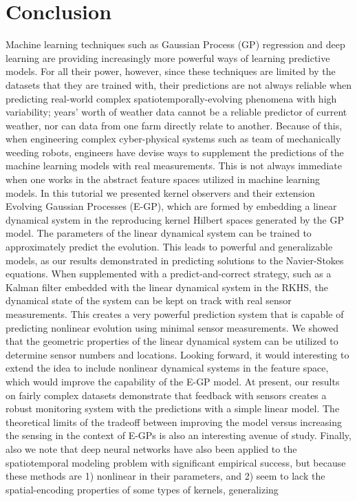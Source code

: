 \documentclass[letterpaper,12pt,peerreviewca,draftcls]{IEEEtran}
\begin{document}







%

\section{Conclusion}\label{sec:conclusion}
Machine learning techniques such as Gaussian Process (GP) regression and deep learning are providing increasingly more powerful ways of learning predictive models. For all their power, however, since these techniques are limited by the datasets that they are trained with, their predictions are not always reliable when predicting real-world complex spatiotemporally-evolving phenomena with high variability; years' worth of weather data cannot be a reliable predictor of current weather, nor can data from one farm directly relate to another. Because of this, when engineering complex cyber-physical systems such as team of mechanically weeding robots, engineers have devise ways to supplement the predictions of the machine learning models with real measurements. This is not always immediate when one works in the abstract feature spaces utilized in machine learning models. In this tutorial we presented kernel observers and their extension Evolving Gaussian Processes (E-GP), which are formed by embedding a linear dynamical system in the reproducing kernel Hilbert spaces generated by the GP model. The parameters of the linear dynamical system can be trained to approximately predict the evolution. This leads to powerful and generalizable models, as our results demonstrated in predicting solutions to the Navier-Stokes equations. When supplemented with a predict-and-correct strategy, such as a Kalman filter embedded with the linear dynamical system in the RKHS, the dynamical state of the system can be kept on track with real sensor measurements. This creates a very powerful prediction system that is capable of predicting nonlinear evolution using minimal sensor measurements. We showed that the geometric properties of the linear dynamical system can be utilized to determine sensor numbers and locations. Looking forward, it would interesting to extend the idea to include nonlinear dynamical systems in the feature space, which would improve the capability of the E-GP model. At present, our results on fairly complex datasets demonstrate that feedback with sensors creates a robust monitoring system with the predictions with a simple linear model. The theoretical limits of the tradeoff between improving the model versus increasing the sensing in the context of E-GPs is also an interesting avenue of study. Finally, also we note that deep neural networks have also been applied to the spatiotemporal modeling problem with significant empirical success\cite{tran2015learning}, but because these methods are 1) nonlinear in their parameters, and 2) seem to lack the spatial-encoding properties of some types of kernels, generalizing 
\end{document}
